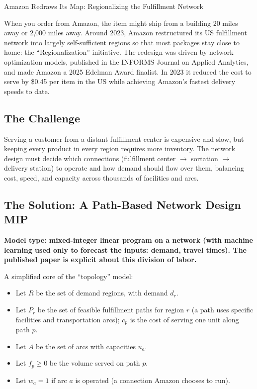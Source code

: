 \begin{casestudybox}{Amazon Redraws Its Map: Regionalizing the Fulfillment Network}
\label{case:amazon-regionalization}

When you order from Amazon, the item might ship from a building 20 miles away or 2{,}000 miles away.  Around 2023, Amazon restructured its US fulfillment network into largely self-sufficient regions so that most packages stay close to home: the ``Regionalization'' initiative.  The redesign was driven by network optimization models, published in the INFORMS Journal on Applied Analytics, and made Amazon a 2025 Edelman Award finalist.  In 2023 it reduced the cost to serve by \$0.45 per item in the US while achieving Amazon's fastest delivery speeds to date.

\subsection*{The Challenge}
Serving a customer from a distant fulfillment center is expensive and slow, but keeping every product in every region requires more inventory.  The network design must decide which connections (fulfillment center $\to$ sortation $\to$ delivery station) to operate and how demand should flow over them, balancing cost, speed, and capacity across thousands of facilities and arcs.

\subsection*{The Solution: A Path-Based Network Design MIP}
\textbf{Model type: mixed-integer linear program on a network (with machine learning used only to forecast the inputs: demand, travel times).  The published paper is explicit about this division of labor.}

A simplified core of the ``topology'' model:

\begin{itemize}
\item Let $R$ be the set of demand regions, with demand $d_r$.
\item Let $P_r$ be the set of feasible fulfillment paths for region $r$ (a path uses specific facilities and transportation arcs); $c_p$ is the cost of serving one unit along path $p$.
\item Let $A$ be the set of arcs with capacities $u_a$.
\end{itemize}

\begin{itemize}
\item Let $f_p \geq 0$ be the volume served on path $p$.
\item Let $w_a = 1$ if arc $a$ is operated (a connection Amazon chooses to run).
\end{itemize}


\end{casestudybox}
